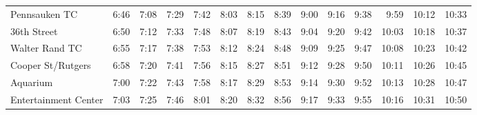 \begin{center}
\begin{tabular}{@{}lrrrrrrrrrrrrr@{}}
Pennsauken TC & 6:46 & 7:08 & 7:29 & 7:42 & 8:03 & 8:15 & 8:39 & 9:00 & 9:16 & 9:38 & 9:59 & 10:12 & 10:33 \\
36th Street & 6:50 & 7:12 & 7:33 & 7:48 & 8:07 & 8:19 & 8:43 & 9:04 & 9:20 & 9:42 & 10:03 & 10:18 & 10:37 \\
Walter Rand TC & 6:55 & 7:17 & 7:38 & 7:53 & 8:12 & 8:24 & 8:48 & 9:09 & 9:25 & 9:47 & 10:08 & 10:23 & 10:42 \\
Cooper St/Rutgers & 6:58 & 7:20 & 7:41 & 7:56 & 8:15 & 8:27 & 8:51 & 9:12 & 9:28 & 9:50 & 10:11 & 10:26 & 10:45 \\
Aquarium & 7:00 & 7:22 & 7:43 & 7:58 & 8:17 & 8:29 & 8:53 & 9:14 & 9:30 & 9:52 & 10:13 & 10:28 & 10:47 \\
Entertainment Center & 7:03 & 7:25 & 7:46 & 8:01 & 8:20 & 8:32 & 8:56 & 9:17 & 9:33 & 9:55 & 10:16 & 10:31 & 10:50 \\
\bottomrule\end{tabular}\end{center}
